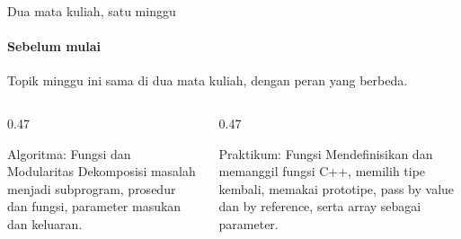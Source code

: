 \documentclass[t]{beamer}
\begin{document}

\begin{frame}{Dua mata kuliah, satu minggu}
\framesubtitle{Sebelum mulai}
Topik minggu ini sama di dua mata kuliah, dengan peran yang berbeda.
\vspace{10pt}

\begin{columns}[T]
\begin{column}{0.47\textwidth}
\begin{Blok}{Algoritma: Fungsi dan Modularitas}
Dekomposisi masalah menjadi subprogram, prosedur dan fungsi, parameter masukan dan keluaran.
\end{Blok}
\end{column}
\begin{column}{0.47\textwidth}
\begin{BlokGelap}{Praktikum: Fungsi}
Mendefinisikan dan memanggil fungsi C++, memilih tipe kembali, memakai prototipe, pass by value dan by reference, serta array sebagai parameter.
\end{BlokGelap}
\end{column}
\end{columns}
\end{frame}
\end{document}

